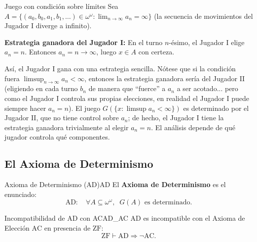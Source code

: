 \begin{ejemplo}{Juego con condición sobre límites}{}
Sea $A = \{(a_0, b_0, a_1, b_1, \ldots) \in \omega^\omega : \lim_{n \to \infty} a_n = \infty\}$ (la secuencia de movimientos del Jugador I diverge a infinito).

\medskip
\textbf{Estrategia ganadora del Jugador I:} En el turno $n$-ésimo, el Jugador I elige $a_n = n$. Entonces $a_n = n \to \infty$, luego $x \in A$ con certeza.

\medskip
Así, el Jugador I gana con una estrategia sencilla. Nótese que si la condición fuera $\limsup_{n \to \infty} a_n < \infty$, entonces la estrategia ganadora sería del Jugador II (eligiendo en cada turno $b_n$ de manera que ``fuerce'' a $a_n$ a ser acotado... pero como el Jugador I controla sus propias elecciones, en realidad el Jugador I puede siempre hacer $a_n = n$). El juego $G(\{x : \limsup a_n < \infty\})$ es determinado por el Jugador II, que no tiene control sobre $a_n$; de hecho, el Jugador I tiene la estrategia ganadora trivialmente al elegir $a_n = n$. El análisis depende de qué jugador controla qué componentes.
\end{ejemplo}

\subsection{El Axioma de Determinismo}

\begin{definicion}{Axioma de Determinismo (AD)}{AD}
El \textbf{Axioma de Determinismo} es el enunciado:
\[
  \mathrm{AD}: \quad \forall A \subseteq \omega^\omega, \;\; G(A) \text{ es determinado.}
\]
\end{definicion}

\begin{teorema}{Incompatibilidad de AD con AC}{AD_AC}
$\mathrm{AD}$ es incompatible con el Axioma de Elección $\mathrm{AC}$ en presencia de $\mathrm{ZF}$:
\[
  \mathrm{ZF} \vdash \mathrm{AD} \Rightarrow \neg\mathrm{AC}.
\]
\end{teorema}

